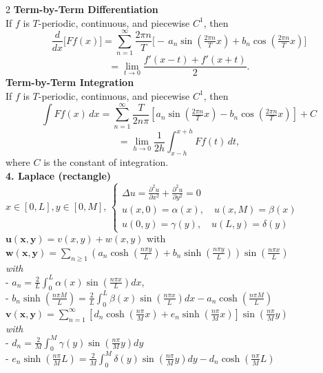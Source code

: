 \documentclass[8pt]{article}
\begin{document}
\begin{multicols}{2}
	\noindent \textbf{Term-by-Term Differentiation}\\
	If $f$ is $T$-periodic, continuous, and piecewise $C^1$, then
	\[
		\frac{d}{dx}\bigl[Ff(x)\bigr]
		= \sum_{n=1}^\infty \frac{2\pi n}{T}\bigl[-\,a_n\sin(\tfrac{2\pi n}{T}x)
			+b_n\cos(\tfrac{2\pi n}{T}x)\bigr]
	\]
	\[
		= \lim_{t \to 0} \frac{f'(x - t) + f'(x + t)}{2}.
	\]
	\noindent \textbf{Term-by-Term Integration}\\
	If $f$ is $T$-periodic, continuous, and piecewise $C^1$, then
	\[
		\int Ff(x)\,dx
		= \sum_{n=1}^\infty \frac{T}{2 n \pi} \left[ a_n \sin\left(\tfrac{2\pi n}{T}x\right)
			- b_n \cos\left(\tfrac{2\pi n}{T}x\right) \right] + C
	\]
	\[
		= \lim_{h \to 0} \frac{1}{2h} \int_{x - h}^{x + h} Ff(t)\,dt,
	\]
	where $C$ is the constant of integration.\\
	\textbf{4. Laplace (rectangle)}\\ $x \in [0, L], y \in [0, M]$,
	$\begin{cases}
			\Delta u = \frac{\partial^2 u}{\partial x^2} + \frac{\partial^2 u}{\partial y^2} = 0 \\
			u(x, 0) = \alpha(x), \quad u(x, M) = \beta(x)                                        \\
			u(0, y) = \gamma(y), \quad u(L, y) = \delta(y)
		\end{cases}$\\
	$\mathbf{u(x, y)} = v(x, y) + w(x, y)$ with\\
	$\mathbf{w(x, y)} = \sum_{n \geq 1} \left(a_n \cosh\left(\frac{n\pi y}{L}\right) + b_n \sinh\left(\frac{n\pi y}{L}\right)\right) \sin\left(\frac{n\pi x}{L}\right)$\\
	\textit{with}\\
	- $a_n = \frac{2}{L} \int_0^L \alpha(x) \sin\left(\frac{n\pi x}{L}\right) dx$,\\
	- $b_n \sinh\left(\frac{n\pi M}{L}\right) = \frac{2}{L} \int_0^L \beta(x) \sin\left(\frac{n\pi x}{L}\right) dx - a_n \cosh\left(\frac{n\pi M}{L}\right)$\\
	$\mathbf{v(x,y)} = \sum_{n=1}^{\infty} \left[d_n \cosh\left(\frac{n\pi}{M} x\right) + e_n \sinh\left(\frac{n\pi}{M} x\right)\right] \sin\left(\frac{n\pi}{M} y\right)$\\
	\textit{with}\\
	- $d_n = \frac{2}{M} \int_0^M \gamma(y) \sin\left(\frac{n\pi}{M} y\right) dy$\\
	- $e_n \sinh\left(\frac{n\pi}{M} L\right) = \frac{2}{M} \int_0^M \delta(y) \sin\left(\frac{n\pi}{M} y\right) dy - d_n \cosh\left(\frac{n\pi}{M} L\right)$\\

\end{multicols}
\end{document}
